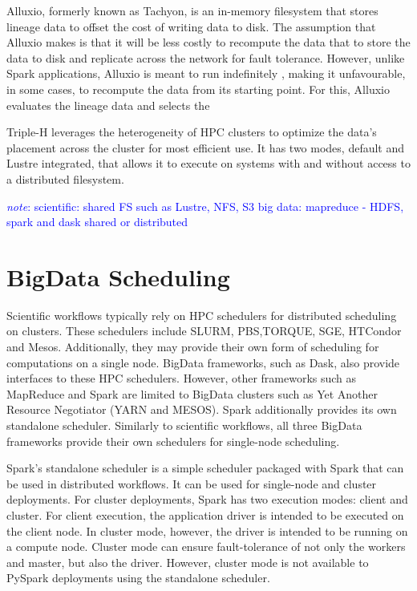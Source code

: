 \documentclass{report}
\newcommand{\note}[1]{\textcolor{blue}{\textit{note}: #1}}
\begin{document}
                Alluxio, formerly known as Tachyon, is an in-memory filesystem
                that stores lineage data to offset the cost of writing data to 
                disk. The assumption that Alluxio makes is that it will be less
                costly to recompute the data that to store the data to disk and
                replicate across the network for fault tolerance. However,
                unlike Spark applications, Alluxio is meant to run indefinitely
                , making it unfavourable, in some cases, to recompute the data
                from its starting point. For this, Alluxio evaluates the 
                lineage data and selects the 

                Triple-H leverages the heterogeneity of HPC clusters to 
                optimize the data's placement across the cluster for most 
                efficient use. It has two modes, default and Lustre integrated,
                that allows it to execute on systems with and without access
                to a distributed filesystem. 
            
            \note{scientific: shared FS such as Lustre, NFS, S3
            big data: mapreduce - HDFS, spark and dask shared or distributed}
        \section{BigData Scheduling}\label{sched}
            
            Scientific workflows typically rely on HPC schedulers for 
            distributed scheduling on clusters. These schedulers include SLURM,
            PBS,TORQUE, SGE, HTCondor and Mesos. Additionally, they may provide
            their own form of scheduling for computations on a single node. 
            BigData frameworks, such as Dask,
            also provide interfaces to these HPC schedulers. However, other
            frameworks such as MapReduce and Spark are limited to BigData 
            clusters such as Yet Another Resource Negotiator (YARN and MESOS).
            Spark additionally provides its own standalone scheduler. Similarly
            to scientific workflows, all three BigData frameworks provide their
            own schedulers for single-node scheduling.

            Spark's standalone scheduler is a simple scheduler packaged with 
            Spark that can be used in distributed workflows. It can be used
            for single-node and cluster deployments. For cluster deployments,
            Spark has two execution modes: client and cluster. For client 
            execution, the application driver is intended to be executed on the
            client node. In cluster mode, however, the driver is intended to be
            running on a compute node. Cluster mode can ensure fault-tolerance 
            of not only the workers and master, but also the driver. However,
            cluster mode is not available to PySpark deployments using the 
            standalone scheduler.
\end{document}
